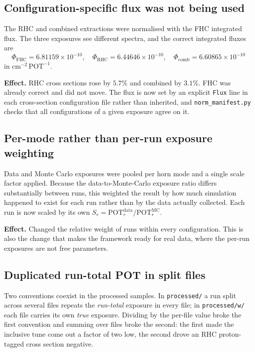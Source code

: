 \subsection{Configuration-specific flux was not being used}

The RHC and combined extractions were normalised with the FHC integrated flux.  The three
exposures see different spectra, and the correct integrated fluxes are
\[
\Phi_{\mathrm{FHC}} = 6.81159\times10^{-10},\quad
\Phi_{\mathrm{RHC}} = 6.44646\times10^{-10},\quad
\Phi_{\mathrm{comb}} = 6.60865\times10^{-10}
\]
in $\mathrm{cm}^{-2}\,\mathrm{POT}^{-1}$.

\textbf{Effect.} RHC cross sections rose by $5.7\%$ and combined by $3.1\%$.  FHC was
already correct and did not move.  The flux is now set by an explicit \texttt{Flux} line
in each cross-section configuration file rather than inherited, and
\texttt{norm\_manifest.py} checks that all configurations of a given exposure agree on it.

\subsection{Per-mode rather than per-run exposure weighting}

Data and Monte Carlo exposures were pooled per horn mode and a single scale factor
applied.  Because the data-to-Monte-Carlo exposure ratio differs substantially between
runs, this weighted the result by how much simulation happened to exist for each run
rather than by the data actually collected.  Each run is now scaled by its own
$S_r = \mathrm{POT}^{\mathrm{data}}_r/\mathrm{POT}^{\mathrm{MC}}_r$.

\textbf{Effect.} Changed the relative weight of runs within every configuration.  This is
also the change that makes the framework ready for real data, where the per-run exposures
are not free parameters.

\subsection{Duplicated run-total POT in split files}

Two conventions coexist in the processed samples.  In \texttt{processed/} a run split
across several files repeats the \emph{run-total} exposure in every file; in
\texttt{processed/w/} each file carries its own \emph{true} exposure.  Dividing by the
per-file value broke the first convention and summing over files broke the second: the
first made the inclusive tune come out a factor of two low, the second drove an RHC
proton-tagged cross section negative.

